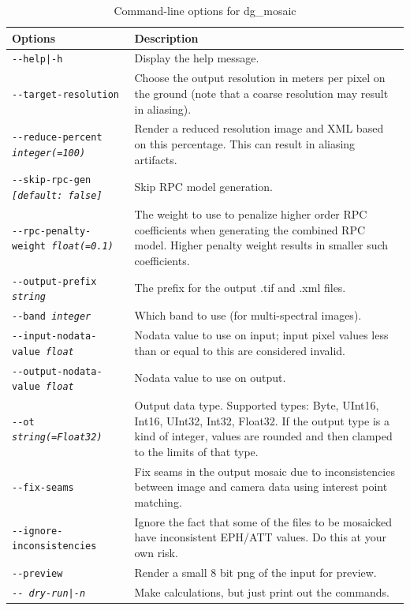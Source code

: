 \begin{longtable}{|l|p{10cm}|}
\caption{Command-line options for dg\_mosaic}
\label{tbl:dgmosaic}
\endfirsthead
\endhead
\endfoot
\endlastfoot
\hline
Options & Description \\ \hline \hline
\texttt{-\/-help|-h} & Display the help message.\\ \hline
\texttt{-\/-target-resolution} &
Choose the output resolution in meters per pixel on the ground (note that a coarse resolution may result in aliasing). \\ \hline
\texttt{-\/-reduce-percent \textit{integer(=100)}} &
Render a reduced resolution image and XML based on this percentage. This can result in aliasing artifacts. \\ \hline
\texttt{-\/-skip-rpc-gen \textit{[default: false]}} &
Skip RPC model generation.\\ \hline
\texttt{-\/-rpc-penalty-weight \textit{float(=0.1)}} &
The weight to use to penalize higher order RPC coefficients when generating the combined RPC model. Higher penalty weight results in smaller such coefficients.\\ \hline
\texttt{-\/-output-prefix \textit{string}} & The prefix for the output .tif and .xml files. \\ \hline
\texttt{-\/-band \textit{integer}} & Which band to use (for multi-spectral images). \\ \hline
\texttt{-\/-input-nodata-value \textit{float}} & Nodata value to use on input; input pixel values less than or equal to this are considered invalid. \\ \hline
\texttt{-\/-output-nodata-value \textit{float}} & Nodata value to use on output. \\ \hline

\texttt{-\/-ot \textit{string(=Float32)}} & Output data type. Supported types: Byte, UInt16, Int16, UInt32, Int32, Float32. If the output type is a kind of integer, values are rounded and then clamped to the limits of that type. \\ \hline

\texttt{-\/-fix-seams} & Fix seams in the output mosaic due to inconsistencies between image and camera data using interest point matching. \\ \hline

\texttt{-\/-ignore-inconsistencies} & Ignore the fact that some of the files to be mosaicked have inconsistent EPH/ATT values. Do this at your own risk. \\ \hline

\texttt{-\/-preview } & Render a small 8 bit png of the input for preview. \\ \hline
\texttt{-\/- \textit{dry-run|-n}} & Make calculations, but just print out the commands. \\ \hline
\end{longtable}

